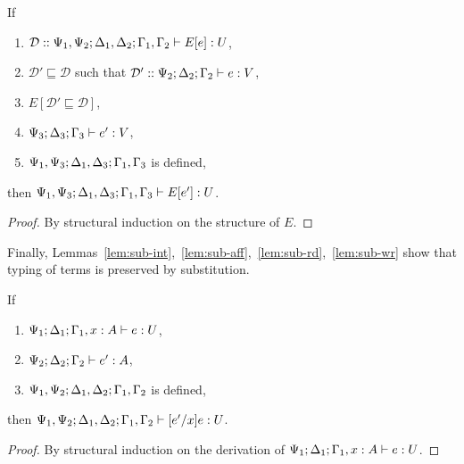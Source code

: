 
\begin{lemma}\label{lem:replacement}
  If 
  \begin{enumerate}
  \item $\mathcal{D} :: \Psi_1,\Psi_2;\Delta_1,\Delta_2;\Gamma_1,\Gamma_2 |- E[e] : U$,
  \item $\mathcal{D}' \sqsubseteq \mathcal{D}$ such that $\mathcal{D}' :: \Psi_2;\Delta_2; \Gamma_2 |- e : V$,
  \item $E[\mathcal{D}' \sqsubseteq \mathcal{D}]$,
  \item $\Psi_3;\Delta_3;\Gamma_3 |- e' : V$,
  \item $\Psi_1,\Psi_3;\Delta_1,\Delta_3;\Gamma_1,\Gamma_3$ is defined,
  \end{enumerate}
  then $\Psi_1,\Psi_3;\Delta_1,\Delta_3;\Gamma_1,\Gamma_3 |- E[e'] : U$.
  \begin{proof}
    By structural induction on the structure of $E$.
  \end{proof}  
\end{lemma}

Finally,
Lemmas~\ref{lem:sub-int},~\ref{lem:sub-aff},~\ref{lem:sub-rd},~\ref{lem:sub-wr}
show that typing of terms is preserved by substitution.

\begin{lemma}\label{lem:sub-int}
  If
  \begin{enumerate}
  \item $\Psi_1; \Delta_1; \Gamma_1, x : A |- e : U$,
  \item $\Psi_2; \Delta_2; \Gamma_2 |- e' : A$,
  \item $\Psi_1,\Psi_2 ; \Delta_1,\Delta_2 ; \Gamma_1,\Gamma_2$ is defined,
  \end{enumerate}
  then $\Psi_1,\Psi_2; \Delta_1,\Delta_2; \Gamma_1,\Gamma_2 |- [e'/x]e : U$.
  \begin{proof}
    By structural induction on the derivation of $\Psi_1; \Delta_1; \Gamma_1, x : A |- e : U$.
  \end{proof}
\end{lemma}

